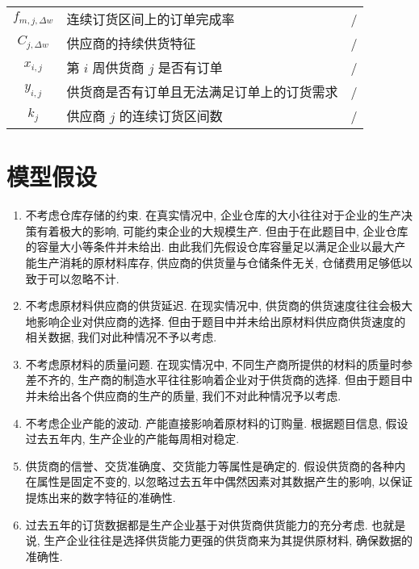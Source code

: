 \documentclass[11pt, fontset = windows]{article}
\begin{document}
\begin{center}
\begin{longtable}{clc}
        $f_{m,j,\Delta w}$   & 连续订货区间上的订单完成率                                            & /     \\
        $C_{j,\Delta w}$     & 供应商的持续供货特征                                               & /     \\
        $x_{i,j}$            & 第 $i$ 周供货商 $j$ 是否有订单                                     & /     \\
        $y_{i,j}$            & 供货商是否有订单且无法满足订单上的订货需求                                    & /     \\
        $k_j$                & 供应商 $j$ 的连续订货区间数                                         & /     \\ \bottomrule
    \end{longtable}
\end{center}

\section[]{模型假设}

\begin{enumerate}

    \item 不考虑仓库存储的约束. 在真实情况中, 企业仓库的大小往往对于企业的生产决策有着极大的影响, 可能约束企业的大规模生产. 但由于在此题目中, 企业仓库的容量大小等条件并未给出. 由此我们先假设仓库容量足以满足企业以最大产能生产消耗的原材料库存, 供应商的供货量与仓储条件无关, 仓储费用足够低以致于可以忽略不计.

    \item 不考虑原材料供应商的供货延迟. 在现实情况中, 供货商的供货速度往往会极大地影响企业对供应商的选择. 但由于题目中并未给出原材料供应商供货速度的相关数据, 我们对此种情况不予以考虑.

    \item 不考虑原材料的质量问题. 在现实情况中, 不同生产商所提供的材料的质量时参差不齐的, 生产商的制造水平往往影响着企业对于供货商的选择. 但由于题目中并未给出各个供应商的生产的质量, 我们不对此种情况予以考虑.

    \item 不考虑企业产能的波动. 产能直接影响着原材料的订购量. 根据题目信息, 假设过去五年内, 生产企业的产能每周相对稳定.

    \item 供货商的信誉、交货准确度、交货能力等属性是确定的. 假设供货商的各种内在属性是固定不变的, 以忽略过去五年中偶然因素对其数据产生的影响, 以保证提炼出来的数字特征的准确性.

    \item 过去五年的订货数据都是生产企业基于对供货商供货能力的充分考虑. 也就是说, 生产企业往往是选择供货能力更强的供货商来为其提供原材料, 确保数据的准确性.

\end{enumerate}
\end{document}
